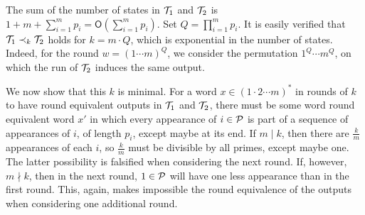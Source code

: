 \begin{example}

The sum of the number of states in $\mathcal{T}_1$ and $\mathcal{T}_2$ is $1+m+\sum_{i=1}^m p_i = \mathsf{O}\left(\sum_{i=1}^m p_i\right)$. Set $Q=\prod_{i=1}^m p_i$. It is easily verified that $\mathcal{T}_1\prec_k \mathcal{T}_2$ holds for $k = m\cdot Q$, which is exponential in the number of states. Indeed, for the round $w=(1\cdots m)^{Q}$, we consider the permutation $1^{Q}\cdots m^{Q}$, on which the run of $\mathcal{T}_2$ induces the same output.

We now show that this $k$ is minimal.
For a word $x\in (1\cdot 2\cdots m)^*$ in rounds of $k$ to have round equivalent outputs in $\mathcal{T}_1$ and $\mathcal{T}_2$, there must be some word round equivalent word $x'$ in which every appearance of $i\in\mathcal{P}$ is part of a sequence of appearances of $i$, of length $p_i$, except maybe at its end. If $m\mid k$, then there are $\frac{k}{m}$ appearances of each $i$, so $\frac{k}{m}$ must be divisible by all primes, except maybe one. The latter possibility is falsified when considering the next round. If, however, $m\nmid k$, then in the next round, $1\in\mathcal{P}$ will have one less appearance than in the first round. This, again, makes impossible the round equivalence of the outputs when considering one additional round.

\end{example}
